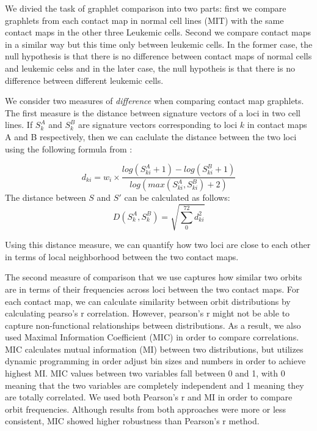 \documentclass[a4,center,fleqn]{NAR}
\begin{document}
We divied the task of graphlet comparison into two parts: first we compare
graphlets from each contact map in normal cell lines (MIT) with the 
same contact maps in the other three Leukemic cells. Second we compare 
contact maps in a similar way but this time only between leukemic cells.
In the former case, the null hypothesis is that there is no difference
between contact maps of normal cells and leukemic celss and in the later
case, the null hypotheis is that there is no difference between 
different leukemic cells.

We consider two measures of \textit{difference} when comparing contact
map graphlets. The first measure is the distance between signature vectors
of a loci in two cell lines. If $S^A_{k}$  and $S^B_{k}$ are 
signature vectors corresponding to loci $k$ in contact maps A and B 
respectively, then we can caclulate the distance between the two loci 
using the following formula from \cite{prvzulj2007biological}:

\begin{equation}
    d_{ki} = w_i \times \frac{log(S^A_{ki}+1) - log(S^B_{ki}+1)}{log(max(S^A_{ki}, S^B_{ki}) + 2)}
\end{equation}
The distance between $S$ and $S'$ can be calculated as follows:
\begin{equation}
    D(S^A_k, S^B_k) = \sqrt{\sum_{0}^{72}{d_{ki}^2}}
\end{equation}


Using this distance measure, we can quantify how two loci are close to
each other in terms of local neighborhood between the two contact maps.

The second measure of comparison that we use captures how 
similar two orbits are in terms of their frequencies across loci
between the two contact maps. For each contact map, we can calculate
similarity between orbit distributions by calculating pearso's r 
correlation. However, pearson's r might not be able to capture
non-functional relationships between distributions. As a result, we
also used Maximal Information Coefficient (MIC) 
\cite{reshef2011detecting} in order to compare
correlations. MIC calculates mutual information (MI) between two
distributions, but utilizes dynamic programming in order adjust
bin sizes and numbers in order to achieve highest MI.
MIC values between two variables fall between 0 and 1,
with 0 meaning that the two variables are completely independent
and 1 meaning they are totally correlated.
We used both Pearson's r and MI in order to compare orbit
frequencies. Although results from both approaches were more
or less consistent, MIC showed higher robustness than Pearson's 
r method.
\end{document}
